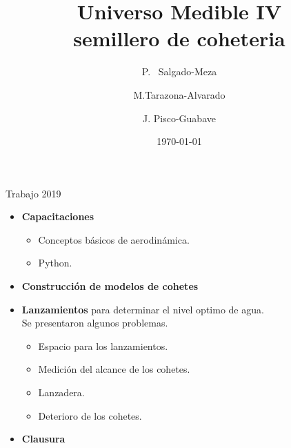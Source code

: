 \documentclass{beamer}
\title[Universo Medible IV] 
{Universo Medible IV \\ semillero de coheteria}
\author[P. Salgado-Meza ] 
{P. ~Salgado-Meza \inst{} \and M.Tarazona-Alvarado \inst{} \and J. Pisco-Guabave \inst{}} %
\institute[]{
\inst{}Universidad Industrial de Santander, Bucaramanga, Colombia.}
\date{\today}
\begin{document}


\begin{frame}
\titlepage %
\end{frame}

\begin{frame}{Trabajo 2019}
\begin{itemize}
\item \textbf{Capacitaciones}
\begin{itemize}
 \item Conceptos básicos de aerodinámica.
 \item Python.
\end{itemize}
\item \textbf{Construcción de modelos de cohetes} 
\item \textbf{Lanzamientos} para determinar el nivel optimo de agua. \\
Se presentaron algunos problemas.
\begin{itemize}
\item Espacio para los lanzamientos.
\item Medición del alcance de los cohetes.
\item Lanzadera.
\item Deterioro de los cohetes.
\end{itemize}
\item \textbf{Clausura}
\end{itemize}
\end{frame}
\end{document}
